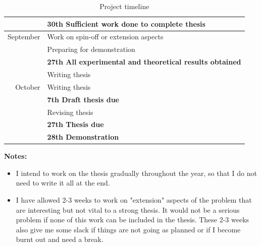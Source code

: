 \begin{table}
\begin{tabular}{r l}
			& \textbf{30th Sufficient work done to
			  complete thesis} \\ \hline
September		& Work on spin-off or extension aspects \\
			& Preparing for demonstration \\
			& \textbf{27th All experimental and
			  theoretical results obtained} \\
			& Writing thesis \\ \hline
October			& Writing thesis \\
			& \textbf{7th Draft thesis due} \\
			& Revising thesis \\
			& \textbf{27th Thesis due} \\
			& \textbf{28th Demonstration} \\
\hline
\end{tabular}
\caption{Project timeline}
\label{table:timeline}
\end{table}

\noindent\textbf{Notes:}

\begin{itemize}
\item 	I intend to work on the thesis gradually throughout the year,
	so that I do not need to write it all at the end.

\item	I have allowed 2-3 weeks to work on "extension" aspects of the
	problem that are interesting but not vital to a strong thesis.  It
	would not be a serious problem if none of this work can be included in
	the thesis.  These 2-3 weeks also give me some slack if things are not
	going as planned or if I become burnt out and need a break.
\end{itemize}


